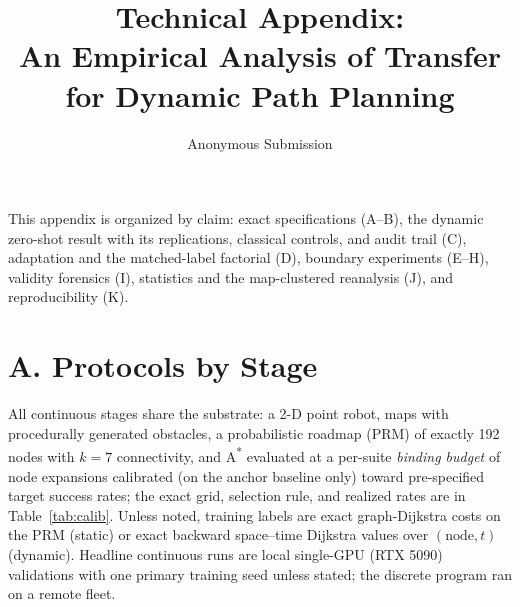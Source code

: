 \documentclass[letterpaper]{article} %
\title{Technical Appendix:\\An Empirical Analysis of Transfer for Dynamic Path Planning}
\author{Anonymous Submission}
\begin{document}
\maketitle

This appendix is organized by claim: exact specifications (A--B), the dynamic zero-shot result with its replications, classical controls, and audit trail (C), adaptation and the matched-label factorial (D), boundary experiments (E--H), validity forensics (I), statistics and the map-clustered reanalysis (J), and reproducibility (K).

\section{A. Protocols by Stage}

All continuous stages share the substrate: a 2-D point robot, maps with procedurally generated obstacles, a probabilistic roadmap (PRM) of exactly 192 nodes with $k{=}7$ connectivity, and A\textsuperscript{*} evaluated at a per-suite \emph{binding budget} of node expansions calibrated (on the anchor baseline only) toward pre-specified target success rates; the exact grid, selection rule, and realized rates are in Table~\ref{tab:calib}. Unless noted, training labels are exact graph-Dijkstra costs on the PRM (static) or exact backward space--time Dijkstra values over $(\text{node},t)$ (dynamic). Headline continuous runs are local single-GPU (RTX 5090) validations with one primary training seed unless stated; the discrete program ran on a remote fleet.
\end{document}
